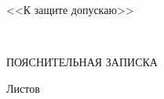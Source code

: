 \begin{ESKDtitlePage}
  \begin{center}
    \envDiplomMinistr

    \envDiplomEducation

    \envDiplomUniversity

    \envDiplomCathedra
  \end{center}
  
  \vfill

  \begin{flushright}
    \begin{minipage}[t]{.45\textwidth}
      <<К защите допускаю>>

      \envDiplomHeadDepartmentInfo

      \underline{\hspace{3cm}} \envDiplomHeadDepartmentInitials~\envDiplomHeadCathedraSurname

      \envDiplomDateInput
    \end{minipage}
  \end{flushright}
  
  \vfill

  \begin{center}
    \envDiplomTitleUppercased

    ПОЯСНИТЕЛЬНАЯ ЗАПИСКА
  \end{center}

  \vfill

  \begin{center}
    \envCode
    
    Листов \pageref{LastPage}
  \end{center}

  \vfill

  

  \vfill

  \begin{center}
    \ESKDtheYear
  \end{center}
\end{ESKDtitlePage}
  